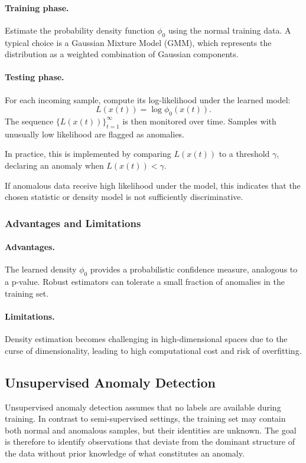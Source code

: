 \documentclass{article}
\begin{document}
\paragraph{Training phase.}  
Estimate the probability density function $\phi_0$ using the normal training
data. A typical choice is a Gaussian Mixture Model (GMM), which represents the
distribution as a weighted combination of Gaussian components.

\paragraph{Testing phase.}  
For each incoming sample, compute its log-likelihood under the learned model:
\[
L(x(t))=\log \phi_0(x(t)).
\]
The sequence $\{L(x(t))\}_{t=1}^{\infty}$ is then monitored over time. Samples
with unusually low likelihood are flagged as anomalies.

In practice, this is implemented by comparing $L(x(t))$ to a threshold
$\gamma$, declaring an anomaly when $L(x(t)) < \gamma$.

If anomalous data receive high likelihood under the model, this indicates that
the chosen statistic or density model is not sufficiently discriminative.

\subsubsection{Advantages and Limitations}

\paragraph{Advantages.}  
The learned density $\phi_0$ provides a probabilistic confidence measure,
analogous to a p-value. Robust estimators can tolerate a small fraction of
anomalies in the training set.

\paragraph{Limitations.}  
Density estimation becomes challenging in high-dimensional spaces due to the
curse of dimensionality, leading to high computational cost and risk of
overfitting.

\subsection{Unsupervised Anomaly Detection}

Unsupervised anomaly detection assumes that no labels are available during
training. In contrast to semi-supervised settings, the training set may contain
both normal and anomalous samples, but their identities are unknown. The goal
is therefore to identify observations that deviate from the dominant structure
of the data without prior knowledge of what constitutes an anomaly.
\end{document}
